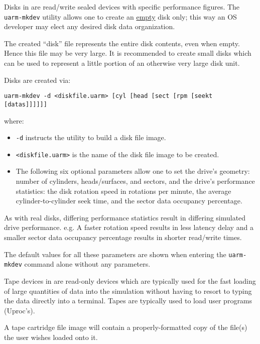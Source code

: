 
Disks in \uarm{} are read/write sealed devices with specific performance figures.
The \texttt{uarm-mkdev} utility allows one to create an \uline{empty} disk only; this way an OS developer may elect any desired disk data organization.

The created “disk” file represents the entire disk contents, even when empty.
Hence this file may be very large. 
It is recommended to create small disks which can be used to represent a little portion of an otherwise very large disk unit.

Disks are created via:

\noindent
\begin{lstlisting}
uarm-mkdev -d <diskfile.uarm> [cyl [head [sect [rpm [seekt [datas]]]]]]
\end{lstlisting}

\noindent
where:
\begin{itemize}
	\item \texttt{-d} instructs the utility to build a disk file image.
	\item \texttt{<diskfile.uarm>} is the name of the disk file image to be created.
	\item The following six optional parameters allow one to set the drive’s geometry: number of cylinders, heads/surfaces, and sectors, and the drive’s performance statistics: the disk rotation speed in rotations per minute, the average cylinder-to-cylinder seek time, and the sector data occupancy percentage.
\end{itemize}

As with real disks, differing performance statistics result in differing simulated drive performance. 
e.g. A faster rotation speed results in less latency delay and a smaller sector data occupancy percentage results in shorter read/write times.

The default values for all these parameters are shown when entering the \texttt{uarm-mkdev} command alone without any parameters.

Tape devices in \uarm{} are read-only devices which are typically used for the fast loading of large quantities of data into the simulation without having to resort to typing the data directly into a terminal.
Tapes are typically used to load user programs (Uproc’s).

A tape cartridge file image will contain a properly-formatted copy of the file(s) the user wishes loaded onto it.

